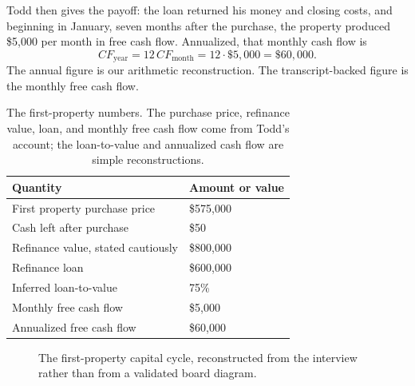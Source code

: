 Todd then gives the payoff: the loan returned his money and closing costs, and beginning in January, seven months after the purchase, the property produced \$5,000 per month in free cash flow. Annualized, that monthly cash flow is
\begin{equation}
CF_{\mathrm{year}}
=
12\,CF_{\mathrm{month}}
=
12\cdot \$5{,}000
=
\$60{,}000.
\end{equation}
The annual figure is our arithmetic reconstruction. The transcript-backed figure is the monthly free cash flow.

\begin{table}
\centering
\begin{tabular}{ll}
\hline
Quantity & Amount or value \\
\hline
First property purchase price & \$575,000 \\
Cash left after purchase & \$50 \\
Refinance value, stated cautiously & \$800,000 \\
Refinance loan & \$600,000 \\
Inferred loan-to-value & 75\% \\
Monthly free cash flow & \$5,000 \\
Annualized free cash flow & \$60,000 \\
\hline
\end{tabular}
\caption{The first-property numbers. The purchase price, refinance value, loan, and monthly free cash flow come from Todd's account; the loan-to-value and annualized cash flow are simple reconstructions.}
\end{table}

\begin{figure}
\centering
{}
\caption{The first-property capital cycle, reconstructed from the interview rather than from a validated board diagram.}
\end{figure}

